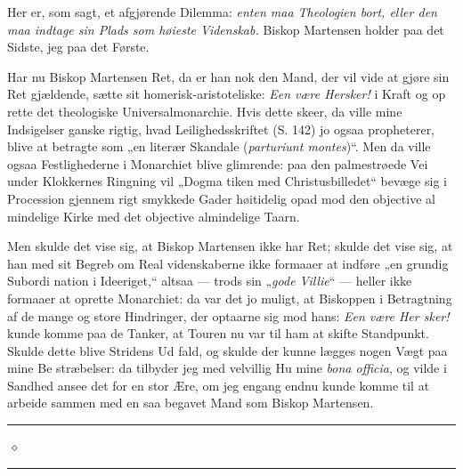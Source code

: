 \documentclass[12pt]{book}
\newcommand{\opage}[1]{\marginnote{\footnotesize\textit{[#1]}}}
\begin{document}
Her er, som sagt, et afgjørende Dilemma: \emph{enten maa
Theologien bort, eller den maa indtage sin Plads
som høieste Videnskab.} Biskop Martensen holder paa
det Sidste, jeg paa det Første.

Har nu Biskop Martensen Ret, da er han nok den
Mand, der vil vide at gjøre sin Ret gjældende, sætte sit
homerisk-aristoteliske: \emph{Een være Hersker!} i Kraft og op\-%
rette det theologiske Universalmonarchie. Hvis dette skeer, da
ville mine Indsigelser ganske rigtig, hvad Leilighedsskriftet
(S. 142) jo ogsaa propheterer, blive at betragte som „en
literær Skandale (\textit{parturiunt montes})“. Men da ville
ogsaa Festlighederne i Monarchiet blive glimrende: paa den
palmestrøede Vei under Klokkernes Ringning vil „Dogma\-%
tiken med Christusbilledet“ bevæge sig i Procession gjennem
rigt smykkede Gader høitidelig opad mod den objective al\-%
mindelige Kirke med det objective almindelige Taarn.

Men skulde det vise sig, at Biskop Martensen ikke har
Ret; skulde det vise sig, at han med sit Begreb om Real\-%
videnskaberne ikke formaaer at indføre „en grundig Subordi\-%
nation i Ideeriget,“ altsaa --- trods sin „\emph{gode Villie}“ ---
\opage{141}\setcounter{footnote}{0}%
heller ikke formaaer at oprette Monarchiet: da var det jo
muligt, at Biskoppen i Betragtning af de mange og store
Hindringer, der optaarne sig mod hans: \emph{Een være Her\-%
sker!} kunde komme paa de Tanker, at Touren nu var til
ham at skifte Standpunkt. Skulde dette blive Stridens Ud\-%
fald, og skulde der kunne lægges nogen Vægt paa mine Be\-%
stræbelser: da tilbyder jeg med velvillig Hu mine \textit{bona
officia}, og vilde i Sandhed ansee det for en stor Ære, om
jeg engang endnu kunde komme til at arbeide sammen med
en saa begavet Mand som Biskop Martensen.

\begin{center}
\rule[0.5ex]{3em}{0.4pt}\,$\diamond$\,\rule[0.5ex]{3em}{0.4pt}
\end{center}

\end{document}
